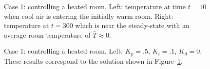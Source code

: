 \documentclass[11pt]{article}
\begin{document}
\begin{figure}[hbt]
\newcommand{\figWidth}{7.25cm}
\newcommand{\trimfig}[2]{\trimFig{#1}{#2}{0.0}{0.0}{.2}{.2}}
\begin{center}
\end{center}
  \caption{Case 1: controlling a heated room.
  Left: temperature at time $t=10$ when cool air is entering the initially warm room.
  Right: temperature at $t=300$ which is near the steady-state with an average room temperature of $\bar{T}\approx 0$. }
  \label{fig:heatedRoomT}
\end{figure}



\begin{figure}[hbt]
\newcommand{\figWidth}{7.25cm}
\newcommand{\trimfig}[2]{\trimFig{#1}{#2}{0.0}{0.0}{.0}{.0}}
\begin{center}
\end{center}
  \caption{Case 1: controlling a heated room. Left: $K_p=.5$, $K_i=.1$, $K_d=0$. These results correspond to the solution shown
in Figure~\ref{fig:heatedRoomT}.}
  \label{fig:heatedRoomControlVariables}
\end{figure}


\clearpage



% 
% 
\end{document}
